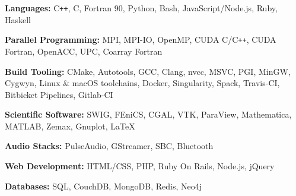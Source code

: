 \documentclass[11pt]{article}
\newcommand{\resumeSection}[1]{
    \par
    \large {\sc {#1}}
    \par
    \vspace{-0.9\baselineskip}
    \hrulefill
    \vspace{0.25\baselineskip}
    \par
}
\newenvironment{resumeSubSectionBody}{
    \par
    \vspace{-0.4\parskip}
    \begin{small}
    \par
} {
    \par
    \end{small}
    \par
}
\newenvironment{resumeDescription}{
    \vspace{-0.5\baselineskip}
    \begin{description}
} {
    \end{description}
}
\begin{document}
\begin{resumeSubSectionBody}
    \begin{resumeDescription}
        \item{\bf Languages:}
            C\verb!++!, C, Fortran 90, Python, Bash,
            JavaScript/Node.js, Ruby, Haskell

        \item{\bf Parallel Programming:}
            MPI, MPI-IO, OpenMP, CUDA C/C\verb!++!, CUDA Fortran,
            OpenACC, UPC, Coarray Fortran

        \item{\bf Build Tooling:}
            CMake, Autotools, GCC, Clang, nvcc, MSVC, PGI, MinGW, Cygwyn,
            Linux \& macOS toolchains,
            Docker, Singularity, Spack,
            Travis-CI, Bitbicket Pipelines, Gitlab-CI

        \item{\bf Scientific Software:}
            SWIG, FEniCS, CGAL, VTK, ParaView,
            Mathematica, MATLAB, Zemax, Gnuplot, LaTeX

        \item{\bf Audio Stacks:}
            PulseAudio, GStreamer, SBC, Bluetooth

        \item{\bf Web Development:}
            HTML/CSS, PHP, Ruby On Rails, Node.js, jQuery

        \item{\bf Databases:}
            SQL, CouchDB, MongoDB, Redis, Neo4j
    \end{resumeDescription}

\end{resumeSubSectionBody}




\resumeSection{Experience}


%
%
\end{document}
